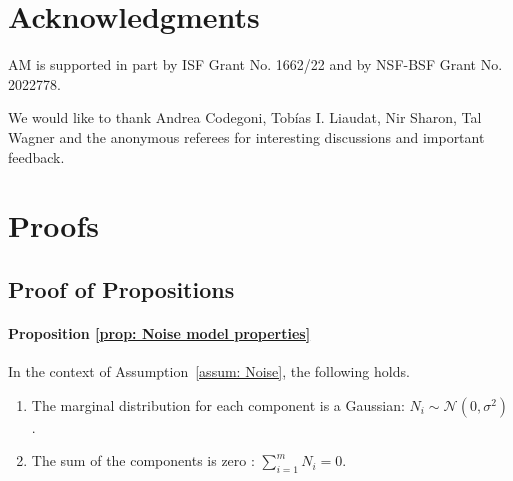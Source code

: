 \documentclass{article}
\theoremstyle{plain}
\theoremstyle{definition}
\theoremstyle{remark}
\begin{document}
\section*{Acknowledgments}
AM is supported in part by ISF Grant No. 1662/22 and by NSF-BSF Grant No.
2022778.

We would like to thank Andrea Codegoni, Tobías I. Liaudat, Nir Sharon, Tal Wagner and the anonymous referees for interesting discussions and important feedback.

\FloatBarrier




\appendix


\section{Proofs}
\label{app: DefProofs}

\subsection{Proof of Propositions}
\paragraph{Proposition \ref{prop: Noise model properties}}
In the context of Assumption~\ref{assum: Noise}, the following holds.
\begin{enumerate}
    \item The marginal distribution for each component is a Gaussian: $N_i \sim \mathcal{N}(0, \sigma^2)$.
    \item The sum of the components is zero : $\sum_{i=1}^m N_i = 0$.
\end{enumerate}
\end{document}
